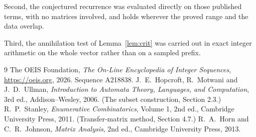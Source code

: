 \documentclass[11pt,a4paper]{article}
\theoremstyle{plain}
\theoremstyle{definition}
\begin{document}
Second, the conjectured recurrence was evaluated directly on those published terms, with no
matrices involved, and holds wherever the proved range and the data overlap.

Third, the annihilation test of Lemma~\ref{lem:crit} was carried out in exact integer
arithmetic on the whole vector rather than on a sampled prefix.

\begin{thebibliography}{9}
 The OEIS Foundation, \emph{The On-Line Encyclopedia of Integer
Sequences}, \url{https://oeis.org}, 2026. Sequence A218838.
 J.~E.~Hopcroft, R.~Motwani and J.~D.~Ullman, \emph{Introduction to Automata
Theory, Languages, and Computation}, 3rd ed., Addison--Wesley, 2006. (The subset
construction, Section 2.3.)
 R.~P.~Stanley, \emph{Enumerative Combinatorics}, Volume 1, 2nd ed.,
Cambridge University Press, 2011. (Transfer-matrix method, Section 4.7.)
 R.~A.~Horn and C.~R.~Johnson, \emph{Matrix Analysis}, 2nd ed., Cambridge
University Press, 2013.
\end{thebibliography}
\end{document}
